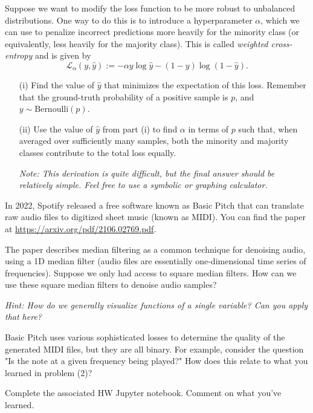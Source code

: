 \documentclass[11pt]{article}
\begin{document}
\begin{subparts}
        \subpart Suppose we want to modify the loss function to be more robust to unbalanced distributions. One way to do this is to introduce a hyperparameter $\alpha$, which we can use to penalize incorrect predictions more heavily for the minority class (or equivalently, less heavily for the majority class). This is called \emph{weighted cross-entropy} and is given by
        $$
        \mathcal{L}_\alpha(y, \hat{y}) := - \alpha y \log \hat{y} - (1 - y) \log (1 - \hat{y}).
        $$
        \begin{enumerate}
            \item[(i)] Find the value of $\hat{y}$ that minimizes the expectation of this loss. Remember that the ground-truth probability of a positive sample is $p$, and $y \sim \text{Bernoulli}(p)$.
            
            
            \item[(ii)] Use the value of $\hat{y}$ from part (i) to find $\alpha$ in terms of $p$ such that, when averaged over sufficiently many samples, both the minority and majority classes contribute to the total loss equally.
            
            \emph{Note: This derivation is quite difficult, but the final answer should be relatively simple. Feel free to use a symbolic or graphing calculator.}
            
        \end{enumerate}
    \end{subparts}

    \newpage
        In 2022, Spotify released a free software known as Basic Pitch that can translate raw audio files to digitized sheet music (known as MIDI). You can find the paper at \url{https://arxiv.org/pdf/2106.02769.pdf}.
        \begin{subparts}
            \subpart The paper describes median filtering as a common technique for denoising audio, using a 1D median filter (audio files are essentially one-dimensional time series of frequencies). Suppose we only had access to square median filters. How can we use these square median filters to denoise audio samples?

            \emph{Hint: How do we generally visualize functions of a single variable? Can you apply that here?}

            \subpart Basic Pitch uses various sophisticated losses to determine the quality of the generated MIDI files, but they are all binary. For example, consider the question "Is the note at a given frequency being played?" How does this relate to what you learned in problem (2)?
            
            \subpart Complete the associated HW Jupyter notebook. Comment on what you've learned.
            
        \end{subparts}
\end{document}
